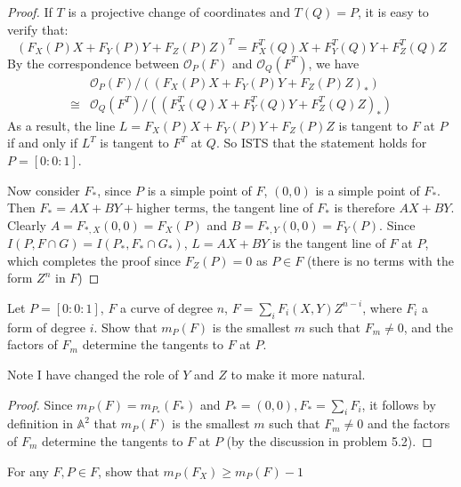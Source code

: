 \documentclass{solution}
\begin{document}
\begin{proof}
    If $T$ is a projective change of coordinates and $T(Q) = P$, it is easy to verify that:
    $$(F_X(P)X + F_Y(P)Y + F_Z(P)Z)^T = F_X^T(Q)X + F_Y^T(Q)Y + F_Z^T(Q)Z$$
    By the correspondence between $\mathcal{O}_{P}(F)$ and $\mathcal{O}_{Q}(F^T)$, we have
    $$
        \begin{aligned}
        &\mathcal{O}_{P}(F) / ((F_X(P)X + F_Y(P)Y + F_Z(P)Z)_*) \\
        \cong &\mathcal{O}_{Q}(F^T) / ((F_X^T(Q)X + F_Y^T(Q)Y + F_Z^T(Q)Z)_*)
        \end{aligned}
    $$
    As a result, the line $L = F_X(P)X + F_Y(P)Y + F_Z(P)Z$ is tangent to $F$ at $P$ if and only if $L^T$ is tangent to $F^T$ at $Q$. So ISTS that the statement holds for $P = [0:0:1]$.
    
    Now consider $F_*$, since $P$ is a simple point of $F$, $(0, 0)$ is a simple point of $F_*$. Then $F_* = AX + BY + \text{higher terms}$, the tangent line of $F_*$ is therefore $AX + BY$. Clearly $A = F_{*, X}(0, 0) = F_X(P)$ and $B = F_{*, Y}(0, 0) = F_Y(P)$. Since $I(P, F \cap G) = I(P_*, F_* \cap G_*)$, $L = AX + BY$ is the tangent line of $F$ at $P$, which completes the proof since $F_Z(P) = 0$ as $P \in F$ (there is no terms with the form $Z^n$ in $F$)
\end{proof}

\begin{problem}{5.5}
    Let $P = [0:0:1]$, $F$ a curve of degree $n$, $F = \sum\limits_{i} F_i(X, Y) Z^{n - i}$, where $F_i$ a form of degree $i$. Show that $m_P(F)$ is the smallest $m$ such that $F_m \ne 0$, and the factors of $F_m$ determine the tangents to $F$ at $P$.
\end{problem}

Note I have changed the role of $Y$ and $Z$ to make it more natural.

\begin{proof}
    Since $m_P(F) = m_{P_*}(F_*)$ and $P_* = (0, 0), F_* = \sum\limits_{i}F_i$, it follows by definition in $\mathbb{A}^2$ that $m_P(F)$ is the smallest $m$ such that $F_m \ne 0$ and the factors of $F_m$ determine the tangents to $F$ at $P$ (by the discussion in problem 5.2).
\end{proof}

\begin{problem}{5.6}
    For any $F, P \in F$, show that $m_P(F_X) \ge m_P(F) - 1$
\end{problem}
\end{document}
